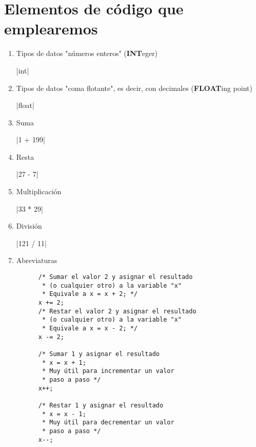 \documentclass[a4paper,oneside]{article}
\begin{document}
\section{Elementos de código que emplearemos}
\begin{enumerate}
  \item Tipos de datos "números enteros" (\textbf{INT}eger)

     |int|
  \item Tipos de datos "coma flotante", es decir, con decimales (\textbf{FLOAT}ing point)

     |float|
  \item Suma

     |1 + 199|
  \item Resta

     |27 - 7|
  \item Multiplicación

     |33 * 29|
  \item División

     |121 / 11|
  \item Abreviaturas

    \begin{verbatim}
      /* Sumar el valor 2 y asignar el resultado
       * (o cualquier otro) a la variable "x"
       * Equivale a x = x + 2; */
      x += 2;
      /* Restar el valor 2 y asignar el resultado
       * (o cualquier otro) a la variable "x"
       * Equivale a x = x - 2; */
      x -= 2;

      /* Sumar 1 y asignar el resultado
       * x = x + 1;
       * Muy útil para incrementar un valor
       * paso a paso */
      x++;

      /* Restar 1 y asignar el resultado
       * x = x - 1;
       * Muy útil para decrementar un valor
       * paso a paso */
      x--;
    \end{verbatim}
\end{enumerate}
\end{document}
